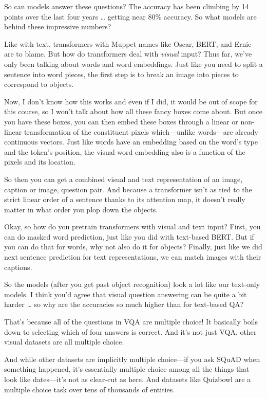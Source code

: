 So can models answer these questions?  The accuracy has been climbing by 14 points over the last four years … getting near 80\% accuracy.  So what models are behind these impressive numbers?

Like with text, transformers with Muppet names like Oscar, BERT, and Ernie are to blame.  But how do transformers deal with \emph{visual} input?  Thus far, we’ve only been talking about words and word embeddings.  Just like you need to split a sentence into word pieces, the first step is to break an image into pieces to correspond to objects.

Now, I don’t know how this works and even if I did, it would be out of scope for this course, so I won’t talk about how all these fancy boxes come about.  But once you have these boxes, you can then embed these boxes through a linear or non-linear transformation of the constituent pixels which—unlike words—are already continuous vectors.  Just like words have an embedding based on the word’s type and the token’s position, the visual word embedding also is a function of the pixels and its location.

So then you can get a combined visual and text representation of an image, caption or image, question pair.  And because a transformer isn’t as tied to the strict linear order of a sentence thanks to its attention map, it doesn’t really matter in what order you plop down the objects. 

Okay, so how do you pretrain transformers with visual and text input?  First, you can do masked word prediction, just like you did with text-based BERT.  But if you can do that for words, why not also do it for objects?  Finally, just like we did next sentence prediction for text representations, we can match images with their captions.  

So the models (after you get past object recognition) look a lot like our text-only models.  I think you’d agree that visual question answering can be quite a bit harder … so why are the accuracies so much higher than for text-based QA?

That’s because all of the questions in VQA are multiple choice!  It basically boils down to selecting which of four answers is correct.  And it’s not just VQA, other visual datasets are all multiple choice.  

And while other datasets are implicitly multiple choice—if you ask SQuAD when something happened, it’s essentially multiple choice among all the things that look like dates—it’s not as clear-cut as here.  And datasets like Quizbowl are a multiple choice task over tens of thousands of entities.  

